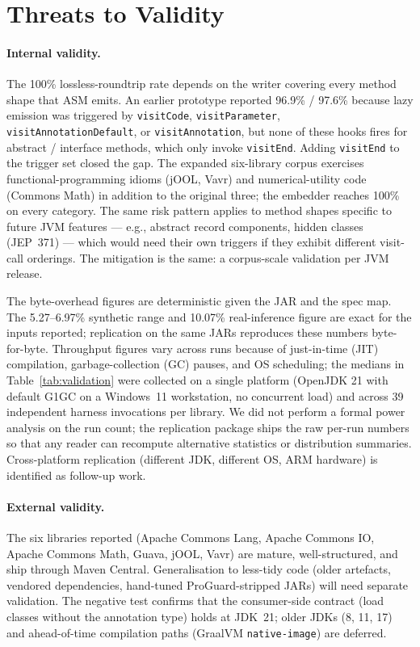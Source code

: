 \section{Threats to Validity}
\label{sec:threats}

\paragraph{Internal validity.}
The 100\% lossless-roundtrip rate depends on the writer covering every method shape that ASM emits. An earlier prototype reported 96.9\% / 97.6\% because lazy emission was triggered by \texttt{visitCode}, \texttt{visitParameter}, \texttt{visitAnnotationDefault}, or \texttt{visitAnnotation}, but none of these hooks fires for abstract / interface methods, which only invoke \texttt{visitEnd}. Adding \texttt{visitEnd} to the trigger set closed the gap. The expanded six-library corpus exercises functional-programming idioms (jOOL, Vavr) and numerical-utility code (Commons Math) in addition to the original three; the embedder reaches 100\% on every category. The same risk pattern applies to method shapes specific to future JVM features --- e.g., abstract record components, hidden classes (JEP~371) --- which would need their own triggers if they exhibit different visit-call orderings. The mitigation is the same: a corpus-scale validation per JVM release.

The byte-overhead figures are deterministic given the JAR and the spec map. The 5.27--6.97\% synthetic range and 10.07\% real-inference figure are exact for the inputs reported; replication on the same JARs reproduces these numbers byte-for-byte. Throughput figures vary across runs because of just-in-time (JIT) compilation, garbage-collection (GC) pauses, and OS scheduling; the medians in Table~\ref{tab:validation} were collected on a single platform (OpenJDK 21 with default G1GC on a Windows~11 workstation, no concurrent load) and across 39 independent harness invocations per library. We did not perform a formal power analysis on the run count; the replication package ships the raw per-run numbers so that any reader can recompute alternative statistics or distribution summaries. Cross-platform replication (different JDK, different OS, ARM hardware) is identified as follow-up work.

\paragraph{External validity.}
The six libraries reported (Apache Commons Lang, Apache Commons IO, Apache Commons Math, Guava, jOOL, Vavr) are mature, well-structured, and ship through Maven Central. Generalisation to less-tidy code (older artefacts, vendored dependencies, hand-tuned ProGuard-stripped JARs) will need separate validation. The negative test confirms that the consumer-side contract (load classes without the annotation type) holds at JDK~21; older JDKs (8, 11, 17) and ahead-of-time compilation paths (GraalVM \texttt{native-image}) are deferred.

